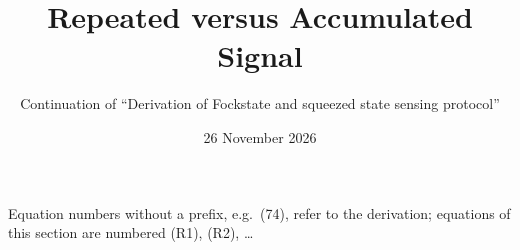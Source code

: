 \documentclass[11pt]{article}
\title{Repeated versus Accumulated Signal}
\author{Continuation of ``Derivation of Fockstate and squeezed state sensing protocol''}
\date{26 November 2026}
\begin{document}
\maketitle
\noindent Equation numbers without a prefix, e.g.\ (74), refer to the derivation; equations of this section are numbered (R1), (R2), \dots
\setcounter{section}{5}

\end{document}

